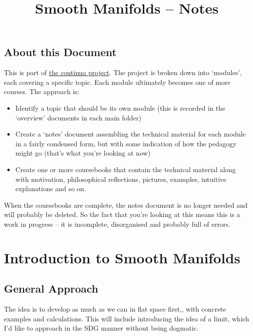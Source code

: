 \documentclass[oneside,english]{amsbook}
\numberwithin{section}{chapter}
\theoremstyle{plain}
\theoremstyle{definition}
\begin{document}
	
	\title{Smooth Manifolds -- Notes}
	
	\maketitle
	
	\tableofcontents
	
	\chapter*{About this Document}
	
	This is part of \href{https://github.com/FineArtMaths/continua}{the continua project}. The project is broken down into `modules', each covering a specific topic. Each module ultimately becomes one of more courses. The approach is:
	
	\begin{itemize}
		\item{Identify a topic that should be its own module (this is recorded in the `overview' documents in each main folder)}
		\item{Create a `notes' document assembling the technical material for each module in a fairly condensed form, but with some indication of how the pedagogy might go (that's what you're looking at now)}
		\item{Create one or more coursebooks that contain the technical material along with motivation, philosophical reflections, pictures, examples, intuitive explanations and so on.}
	\end{itemize}
	
	When the coursebooks are complete, the notes document is no longer needed and will probably be deleted. So the fact that you're looking at this means this is a work in progress -- it is incomplete, disorganised and probably full of errors.
	
	\part{Introduction to Smooth Manifolds}
	
	\chapter*{General Approach}
	
	The idea is to develop as much as we can in flat space first,, with concrete examples and calculations. This will include introducing the idea of a limit, which I'd like to approach in the SDG manner without being dogmatic.
	
\end{document}
